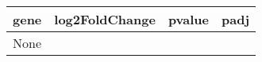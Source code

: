 \begin{tabular}{llll}
\toprule
gene & log2FoldChange & pvalue & padj \\
\midrule
None &                &        &      \\
\bottomrule
\end{tabular}
